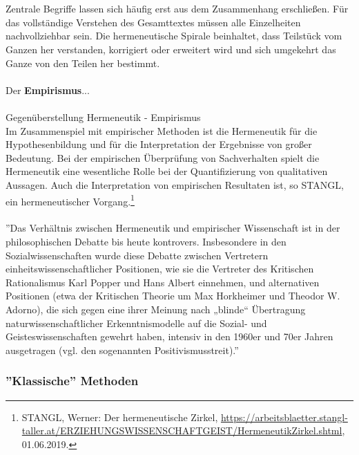 \documentclass[12pt,a4paper]{article}
\begin{document}
\\
\\
Zentrale Begriffe lassen sich häufig erst aus dem Zusammenhang erschließen. Für das vollständige Verstehen des Gesamttextes müssen alle Einzelheiten nachvollziehbar sein. Die hermeneutische Spirale beinhaltet, dass Teilstück vom Ganzen her verstanden, korrigiert oder erweitert wird und sich umgekehrt das Ganze von den Teilen her bestimmt.
\\
\\
Der \textbf{Empirismus}...
\\
\\
Gegenüberstellung Hermeneutik - Empirismus
\\
Im Zusammenspiel mit empirischer Methoden ist die Hermeneutik für die Hypothesenbildung und für die Interpretation der Ergebnisse von großer Bedeutung. Bei der empirischen Überprüfung von Sachverhalten spielt die Hermeneutik eine wesentliche Rolle bei der Quantifizierung von qualitativen Aussagen. Auch die Interpretation von empirischen Resultaten ist, so STANGL, ein hermeneutischer Vorgang.\footnote{STANGL, Werner: Der hermeneutische Zirkel, \protect\url{https://arbeitsblaetter.stangl-taller.at/ERZIEHUNGSWISSENSCHAFTGEIST/HermeneutikZirkel.shtml}, 01.06.2019.}
\\
\\
''Das Verhältnis zwischen Hermeneutik und empirischer Wissenschaft ist in der philosophischen Debatte bis heute kontrovers. Insbesondere in den Sozialwissenschaften wurde diese Debatte zwischen Vertretern einheitswissenschaftlicher Positionen, wie sie die Vertreter des Kritischen Rationalismus Karl Popper und Hans Albert einnehmen, und alternativen Positionen (etwa der Kritischen Theorie um Max Horkheimer und Theodor W. Adorno), die sich gegen eine ihrer Meinung nach „blinde“ Übertragung naturwissenschaftlicher Erkenntnismodelle auf die Sozial- und Geisteswissenschaften gewehrt haben, intensiv in den 1960er und 70er Jahren ausgetragen (vgl. den sogenannten Positivismusstreit).'' 


\subsubsection{''Klassische'' Methoden}
\label{Methoden}
\end{document}
